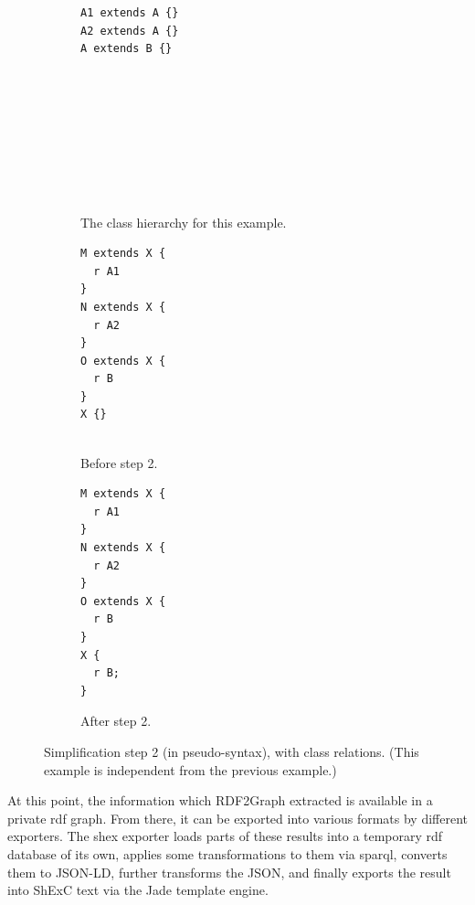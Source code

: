 \begin{figure}[ht]
  \begin{subfigure}[t]{0.3\textwidth}
    \begin{lstlisting}[showlines=true]
A1 extends A {}
A2 extends A {}
A extends B {}









    \end{lstlisting}
    \caption{The class hierarchy for this example.}
    \label{fig:simplify-7.4.2-classes-hierarchy}
  \end{subfigure}
  \begin{subfigure}[t]{0.3\textwidth}
    \begin{lstlisting}[showlines=true]
M extends X {
  r A1
}
N extends X {
  r A2
}
O extends X {
  r B
}
X {}


    \end{lstlisting}
    \caption{Before step 2.}
    \label{fig:simplify-7.4.2-classes-before}
  \end{subfigure}
  \begin{subfigure}[t]{0.3\textwidth}
    \begin{lstlisting}
M extends X {
  r A1
}
N extends X {
  r A2
}
O extends X {
  r B
}
X {
  r B;
}
    \end{lstlisting}
    \caption{After step 2.}
    \label{fig:simplify-7.4.2-classes-after}
  \end{subfigure}
  \caption[Simplification step 2, with class relations.]{
    Simplification step 2 (in pseudo-syntax), with class relations.
    (This example is independent from the previous example.)
  }
  \label{fig:simplify-7.4.2-classes}
\end{figure}

At this point, the information which RDF2Graph extracted is available in a private \gls{rdf} graph.
From there, it can be exported into various formats by different exporters.
The \gls{shex} exporter loads parts of these results into a temporary \gls{rdf} database of its own,
applies some transformations to them via \gls{sparql},
converts them to JSON-LD,
further transforms the JSON,
and finally exports the result into ShExC text via the Jade template engine.

